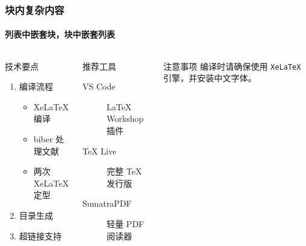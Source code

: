 \begin{frame}
\frametitle{块内复杂内容}
\framesubtitle{列表中嵌套块，块中嵌套列表}

\begin{columns}[T]
\begin{block}{技术要点}
\begin{enumerate}
  \item 编译流程
  \begin{itemize}
    \item XeLaTeX 编译
    \item biber 处理文献
    \item 两次 XeLaTeX 定型
  \end{itemize}
  \item 目录生成
  \item 超链接支持
\end{enumerate}
\end{block}

\begin{exampleblock}{推荐工具}
\begin{description}
\item[VS Code] LaTeX Workshop 插件
\item[TeX Live] 完整 TeX 发行版
\item[SumatraPDF] 轻量 PDF 阅读器
\end{description}
\end{exampleblock}

\vfill

\begin{alertblock}{注意事项}
编译时请确保使用 \texttt{XeLaTeX} 引擎，并安装中文字体。
\end{alertblock}
\end{columns}
\end{frame}
